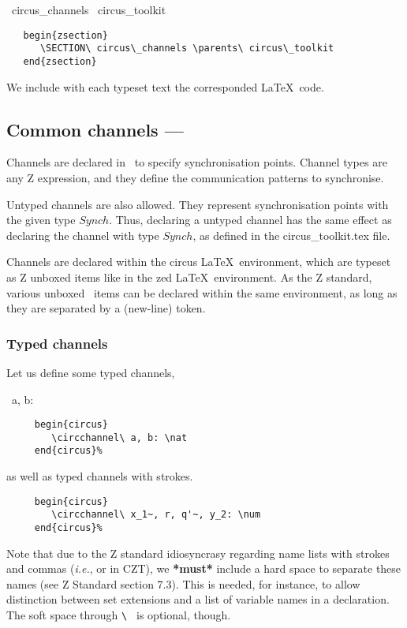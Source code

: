 \documentclass{article}
\begin{document}
\begin{zsection}
  \SECTION\ circus\_channels \parents\ circus\_toolkit
\end{zsection}
%
\begin{verbatim}
   begin{zsection}
      \SECTION\ circus\_channels \parents\ circus\_toolkit
   end{zsection}
\end{verbatim}
%
We include with each typeset text the corresponded \LaTeX\ code.


\subsection{Common channels --- }

Channels are declared in \Circus\ to specify synchronisation points. Channel
types are any Z expression, and they define the communication patterns to
synchronise.

Untyped channels are also allowed. They represent synchronisation points with
the given type $Synch$. Thus, declaring a untyped channel has the same effect
as declaring the channel with type $Synch$, as defined in the
\textsf{circus\_toolkit.tex} file.

Channels are declared within the \textsf{circus} \LaTeX\ environment, which are
typeset as Z unboxed items like in the \textsf{zed} \LaTeX\ environment. As the
Z standard, various unboxed \Circus\ items can be declared within the same
environment, as long as they are separated by a  (new-line) token.

\subsubsection{Typed channels}

Let us define some typed channels,
%
\begin{circus}
  \circchannel\ a, b: \nat
\end{circus}%
%
\begin{verbatim}
     begin{circus}
        \circchannel\ a, b: \nat
     end{circus}%
\end{verbatim}
%
as well as typed channels with strokes.
%
%
%
\begin{verbatim}
     begin{circus}
        \circchannel\ x_1~, r, q'~, y_2: \num
     end{circus}%
\end{verbatim}
%
Note that due to the Z standard idiosyncrasy regarding name lists with strokes
and commas (\textit{i.e.},  or  in CZT),
we \textbf{*must*} include a hard space to separate these names (see Z Standard
section 7.3). This is needed, for instance, to allow distinction between set
extensions and a list of variable names in a declaration. The soft space
through \verb'\ ' is optional, though.
\end{document}
